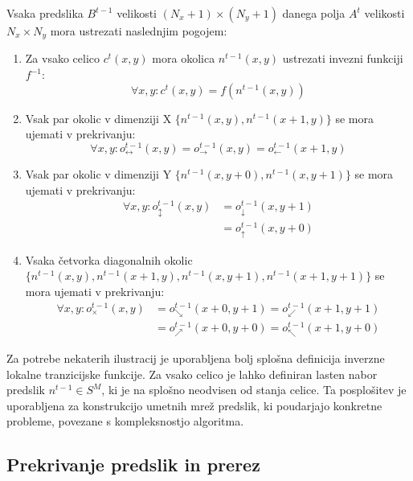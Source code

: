 \documentclass[12pt,a4paper,openany,twoside]{book}
\begin{document}
Vsaka predslika \(B^{t-1}\) velikosti \((N_x+1) \times (N_y+1)\) danega polja \(A^t\) velikosti \(N_x \times N_y\) mora ustrezati naslednjim pogojem:
\begin{enumerate}
\item Za vsako celico \(c^{t}(x,y)\) mora okolica \(n^{t-1}(x,y)\) ustrezati invezni funkciji \(f^{-1}\):
\begin{equation}
\forall x,y : c^{t}(x,y) = f(n^{t-1}(x,y))
\end{equation}
\item Vsak par okolic v dimenziji X \(\{n^{t-1}(x,y), n^{t-1}(x+1,y)\}\) se mora ujemati v prekrivanju:
\begin{equation}
\forall x,y : o_{\leftrightarrow}^{t-1}(x,y) = o_{\rightarrow}^{t-1}(x,y) = o_{\leftarrow}^{t-1}(x+1,y)
\end{equation}
\item Vsak par okolic v dimenziji Y \(\{n^{t-1}(x,y+0), n^{t-1}(x,y+1)\}\) se mora ujemati v prekrivanju:
\begin{equation}
\begin{align}
\forall x,y : o_{\updownarrow}^{t-1}(x,y) &= o_{\downarrow}^{t-1}(x,y+1) \\
                                          &= o_{\uparrow}  ^{t-1}(x,y+0)
\end{align}
\end{equation}
\item Vsaka četvorka diagonalnih okolic \(\{n^{t-1}(x,y), n^{t-1}(x+1,y), n^{t-1}(x,y+1), n^{t-1}(x+1,y+1)\}\) se mora ujemati v prekrivanju:
\begin{equation}
\begin{align}
\forall x,y : o_{\times}^{t-1}(x,y) &= o_{\searrow}^{t-1}(x+0,y+1) = o_{\swarrow}^{t-1}(x+1,y+1) \\
                                    &= o_{\nearrow}^{t-1}(x+0,y+0) = o_{\nwarrow}^{t-1}(x+1,y+0)
\end{align}
\end{equation}
\end{enumerate}

Za potrebe nekaterih ilustracij je uporabljena bolj splošna definicija inverzne lokalne tranzicijske funkcije.
Za vsako celico je lahko definiran lasten nabor predslik \(n^{t-1} \in S^M\),
ki je na splošno neodvisen od stanja celice.
Ta posplošitev je uporabljena za konstrukcijo umetnih mrež predslik,
ki poudarjajo konkretne probleme, povezane s kompleksnostjo algoritma.

\subsection{Prekrivanje predslik in prerez}
\end{document}
